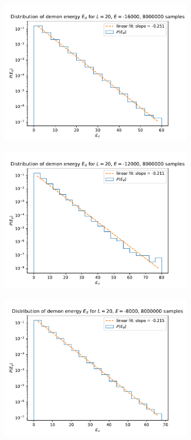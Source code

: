 \documentclass[11pt,a4paper]{article}
\begin{document}
\begin{figure}[b]
\begin{subfigure}{.5\textwidth}
			\includegraphics[width=0.9\textwidth]{E_d_L20_E16000.pdf}
		\end{subfigure}%
		\begin{subfigure}{.5\textwidth}
			\centering
			\includegraphics[width=0.9\textwidth]{E_d_L20_E12000.pdf}
		\end{subfigure}
		\begin{subfigure}{.5\textwidth}
			\centering
			\includegraphics[width=0.9\textwidth]{E_d_L20_E8000.pdf}

\end{subfigure}
\end{figure}
\end{document}
